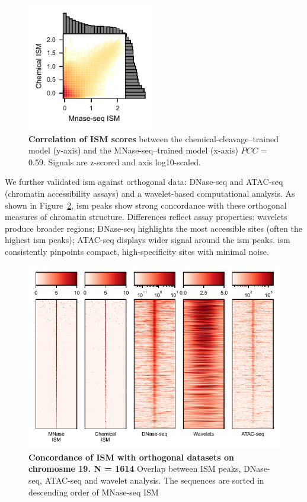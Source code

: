 \documentclass[11pt]{book}
\begin{document}
\begin{figure}[htbp]
    \centering
    \includegraphics[width=0.5\textwidth]{Figures/Results/test_set_muts_histogram.pdf}
    \caption{\textbf{Correlation of ISM scores} between the chemical-cleavage–trained model (y-axis) and the MNase-seq–trained model (x-axis) $PCC=$0.59. Signals are z-scored and axis log10-scaled.}
    \label{fig:corr_muts}
\end{figure}

We further validated \gls{ism} against orthogonal data: DNase-seq and ATAC-seq (chromatin accessibility assays) and a wavelet-based computational analysis. As shown in Figure~\ref{fig:omics_meta}, \gls{ism} peaks show strong concordance with these orthogonal measures of chromatin structure. Differences reflect assay properties: wavelets produce broader regions; DNase-seq highlights the most accessible sites (often the highest \gls{ism} peaks); ATAC-seq displays wider signal around the \gls{ism} peaks. \Gls{ism} consistently pinpoints compact, high-specificity sites with minimal noise.\\

\begin{figure}[htbp]
    \centering
    \includegraphics[width=\textwidth]{Figures/Results/multiomics_mnase_nprs.pdf}
    \caption{\textbf{Concordance of ISM with orthogonal datasets on chromosme 19. N = 1614} Overlap between ISM peaks, DNase-seq, ATAC-seq and wavelet analysis. The sequences are sorted in descending order of MNase-seq ISM}
    \label{fig:omics_meta}
\end{figure}
\end{document}

